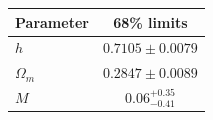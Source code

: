 \begin{tabular} { l  c}

 Parameter &  68\% limits\\
\hline
{\boldmath$h              $} & $0.7105\pm 0.0079          $\\

{\boldmath$Ω_m            $} & $0.2847\pm 0.0089          $\\

{\boldmath$M              $} & $0.06^{+0.35}_{-0.41}      $\\
\hline
\end{tabular}